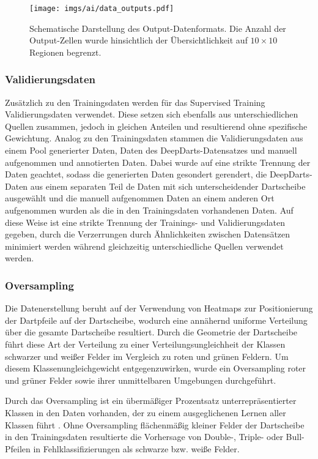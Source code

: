 \begin{figure}
    \centering
    \texttt{[image: imgs/ai/data\_outputs.pdf]}
    \caption{Schematische Darstellung des Output-Datenformats. Die Anzahl der Output-Zellen wurde hinsichtlich der Übersichtlichkeit auf $10 \times 10$ Regionen begrenzt.}
    \label{img:datenformat}
\end{figure}

\subsubsection{Validierungsdaten}
\label{sec:validierungsdaten}

Zusätzlich zu den Trainingsdaten werden für das Supervised Training Validierungsdaten verwendet. Diese setzen sich ebenfalls aus unterschiedlichen Quellen zusammen, jedoch in gleichen Anteilen und resultierend ohne spezifische Gewichtung. Analog zu den Trainingsdaten stammen die Validierungsdaten aus einem Pool generierter Daten, Daten des DeepDarts-Datensatzes und manuell aufgenommen und annotierten Daten. Dabei wurde auf eine strikte Trennung der Daten geachtet, sodass die generierten Daten gesondert gerendert, die DeepDarts-Daten aus einem separaten Teil de Daten mit sich unterscheidender Dartscheibe ausgewählt und die manuell aufgenommen Daten an einem anderen Ort aufgenommen wurden als die in den Trainingsdaten vorhandenen Daten. Auf diese Weise ist eine strikte Trennung der Trainings- und Validierungsdaten gegeben, durch die Verzerrungen durch Ähnlichkeiten zwischen Datensätzen minimiert werden während gleichzeitig unterschiedliche Quellen verwendet werden.


\subsubsection{Oversampling}
\label{sec:oversampling}

Die Datenerstellung beruht auf der Verwendung von Heatmaps zur Positionierung der Dartpfeile auf der Dartscheibe, wodurch eine annähernd uniforme Verteilung über die gesamte Dartscheibe resultiert. Durch die Geometrie der Dartscheibe führt diese Art der Verteilung zu einer Verteilungsungleichheit der Klassen schwarzer und weißer Felder im Vergleich zu roten und grünen Feldern. Um diesem Klassenungleichgewicht entgegenzuwirken, wurde ein Oversampling roter und grüner Felder sowie ihrer unmittelbaren Umgebungen durchgeführt.

Durch das Oversampling ist ein übermäßiger Prozentsatz unterrepräsentierter Klassen in den Daten vorhanden, der zu einem ausgeglichenen Lernen aller Klassen führt \cite{oversampling}. Ohne Oversampling flächenmäßig kleiner Felder der Dartscheibe in den Trainingsdaten resultierte die Vorhersage von Double-, Triple- oder Bull-Pfeilen in Fehlklassifizierungen als schwarze bzw. weiße Felder.

